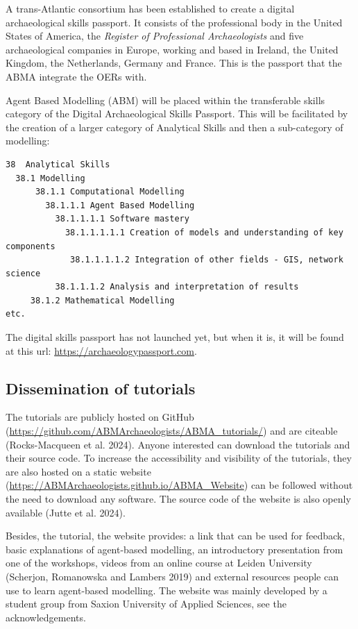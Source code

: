 \documentclass[
]{article}
\begin{document}
A trans-Atlantic consortium has been established to create a digital archaeological skills passport. It consists of the professional body in the United States of America, the \emph{Register of Professional Archaeologists} and five archaeological companies in Europe, working and based in Ireland, the United Kingdom, the Netherlands, Germany and France. This is the passport that the ABMA integrate the OERs with.~

Agent Based Modelling (ABM) will be placed within the transferable skills category of the Digital Archaeological Skills Passport. This will be facilitated by the creation of a larger category of Analytical Skills and then a sub-category of modelling:

\begin{verbatim}
38  Analytical Skills
  38.1 Modelling
      38.1.1 Computational Modelling
        38.1.1.1 Agent Based Modelling
          38.1.1.1.1 Software mastery
            38.1.1.1.1.1 Creation of models and understanding of key components
             38.1.1.1.1.2 Integration of other fields - GIS, network science
          38.1.1.1.2 Analysis and interpretation of results
     38.1.2 Mathematical Modelling
etc.
\end{verbatim}

The digital skills passport has not launched yet, but when it is, it will be found at this url: \url{https://archaeologypassport.com}.

\hypertarget{dissemination-of-tutorials}{%
\subsection{Dissemination of tutorials}\label{dissemination-of-tutorials}}

The tutorials are publicly hosted on GitHub (\url{https://github.com/ABMArchaeologists/ABMA_tutorials/}) and are citeable (Rocks-Macqueen et al. 2024). Anyone interested can download the tutorials and their source code. To increase the accessibility and visibility of the tutorials, they are also hosted on a static website (\href{https://ABMArchaeologists.github.io/ABMA_Website/\#/}{https://ABMArchaeologists.github.io/ABMA\_Website}) can be followed without the need to download any software. The source code of the website is also openly available (Jutte et al. 2024).

Besides, the tutorial, the website provides: a link that can be used for feedback, basic explanations of agent-based modelling, an introductory presentation from one of the workshops, videos from an online course at Leiden University (Scherjon, Romanowska and Lambers 2019) and external resources people can use to learn agent-based modelling. The website was mainly developed by a student group from Saxion University of Applied Sciences, see the acknowledgements.
\end{document}
